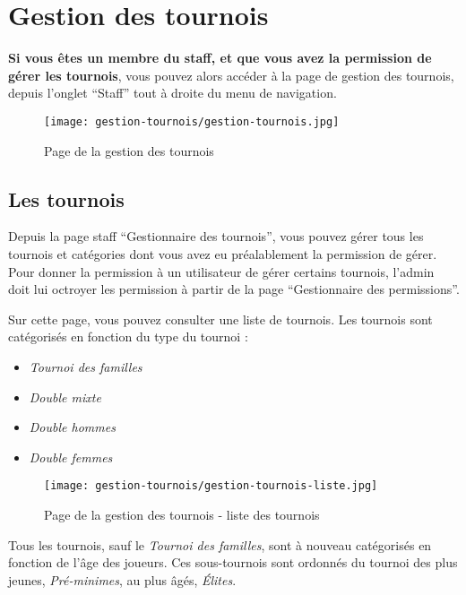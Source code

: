 \section{Gestion des tournois}

\textbf{Si vous êtes un membre du staff, et que vous avez la permission de gérer les tournois}, vous pouvez alors accéder à la page de gestion des tournois, depuis l'onglet \enquote{Staff} tout à droite du menu de navigation.

\begin{figure}[H]
\centering
\texttt{[image: gestion-tournois/gestion-tournois.jpg]}
\caption{Page de la gestion des tournois}
\end{figure}

\subsection{Les tournois}

Depuis la page staff \enquote{Gestionnaire des tournois}, vous pouvez gérer tous les tournois et catégories dont vous avez eu préalablement la permission de gérer. Pour donner la permission à un utilisateur de gérer certains tournois, l'admin doit lui octroyer les permission à partir de la page \enquote{Gestionnaire des permissions}.

Sur cette page, vous pouvez consulter une liste de tournois. Les tournois sont catégorisés en fonction du type du tournoi :

\begin{itemize}
\item \textit{Tournoi des familles}
\item \textit{Double mixte}
\item \textit{Double hommes}
\item \textit{Double femmes}
\end{itemize}

\begin{figure}[H]
\centering
\texttt{[image: gestion-tournois/gestion-tournois-liste.jpg]}
\caption{Page de la gestion des tournois - liste des tournois}
\end{figure}

Tous les tournois, sauf le \textit{Tournoi des familles}, sont à nouveau catégorisés en fonction de l'âge des joueurs. Ces sous-tournois sont ordonnés du tournoi des plus jeunes, \textit{Pré-minimes}, au plus âgés, \textit{Élites}.\newline

